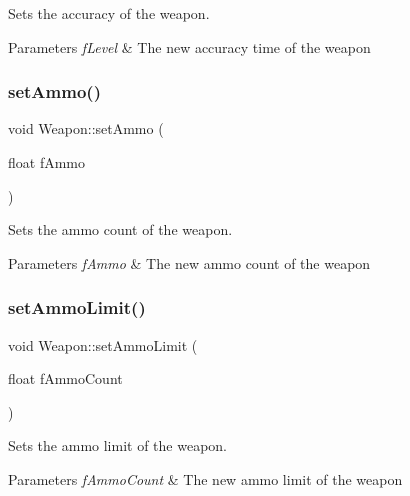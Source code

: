 Sets the accuracy of the weapon. 


\begin{DoxyParams}{Parameters}
{\em f\+Level} & The new accuracy time of the weapon \\
\hline
\end{DoxyParams}
\mbox{\label{class_weapon_afc9beda6416eb70f93402aa7407d5914}} 
\subsubsection{\texorpdfstring{set\+Ammo()}{setAmmo()}}
{\footnotesize\ttfamily void Weapon\+::set\+Ammo (\begin{DoxyParamCaption}\item[{float}]{f\+Ammo }\end{DoxyParamCaption})}



Sets the ammo count of the weapon. 


\begin{DoxyParams}{Parameters}
{\em f\+Ammo} & The new ammo count of the weapon \\
\hline
\end{DoxyParams}
\mbox{\label{class_weapon_a2eb5cda468c7c05ef5f4f0223f2a9c7f}} 
\subsubsection{\texorpdfstring{set\+Ammo\+Limit()}{setAmmoLimit()}}
{\footnotesize\ttfamily void Weapon\+::set\+Ammo\+Limit (\begin{DoxyParamCaption}\item[{float}]{f\+Ammo\+Count }\end{DoxyParamCaption})}



Sets the ammo limit of the weapon. 


\begin{DoxyParams}{Parameters}
{\em f\+Ammo\+Count} & The new ammo limit of the weapon \\
\hline
\end{DoxyParams}
\mbox{\label{class_weapon_a2c78ab8b859adc6934c91d31649742f2}} 
